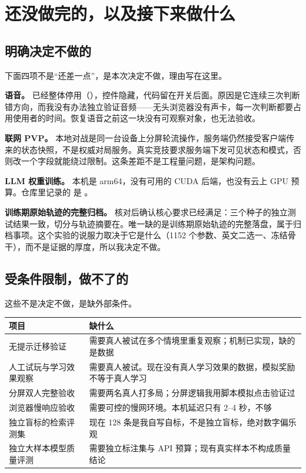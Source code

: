 \section{还没做完的，以及接下来做什么}

\subsection{明确决定不做的}

下面四项不是“还差一点”，是本次决定不做，理由写在这里。

\textbf{语音。} 已经整体停用（），控件隐藏，代码留在开关后面。原因是它连续三次判断错方向，而我没有办法独立验证音频——无头浏览器没有声卡，每一次判断都要占用使用者的时间。恢复语音之前这一块没有可观察对象，也无法验收。

\textbf{联网 PVP。} 本地对战是同一台设备上分屏轮流操作，服务端仍然接受客户端传来的状态快照，不是权威对局服务。真实竞技要求服务端下发可见状态和模式，否则改一个字段就能绕过限制。这条差距不是工程量问题，是架构问题。

\textbf{LLM 权重训练。} 本机是 arm64，没有可用的 CUDA 后端，也没有云上 GPU 预算。仓库里记录的  是 。

\textbf{训练期原始轨迹的完整归档。} 核对后确认核心要求已经满足：三个种子的独立测试结果一致，切分与轨迹摘要在。唯一缺的是训练期原始轨迹的完整落盘，属于归档事项。这个实验的说服力取决于它是什么（1152 个参数、英文二选一、冻结骨干），而不是证据的厚度，所以我决定不做。

\subsection{受条件限制，做不了的}

这些不是决定不做，是缺外部条件。

\begin{table}[h]
\centering
\small
\begin{tabular}{L{4.6cm}L{8.6cm}}
\toprule
项目 & 缺什么 \\
\midrule
无提示迁移验证 & 需要真人被试在多个情境里重复观察；机制已实现，缺的是数据 \\
人工试玩与学习效果观察 & 需要真人被试。现在没有真人学习效果的数据，模拟奖励不等于真人学习 \\
分屏双人完整验收 & 需要两名真人打多局；分屏逻辑我用脚本模拟点击验证过 \\
浏览器慢响应验收 & 需要可控的慢网环境。本机延迟只有 2--4 秒，不够 \\
独立盲标的检索评测集 & 现在 128 条是我自写自标，不是独立盲标，绝对数字偏乐观 \\
独立大样本模型质量评测 & 需要独立标注集与 API 预算；现有真实样本不构成质量结论 \\
\bottomrule
\end{tabular}
\end{table}

